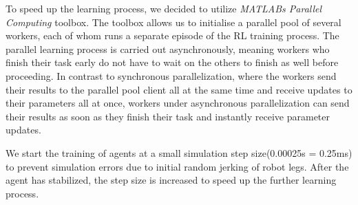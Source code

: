 To speed up the learning process, we decided to utilize \textit{MATLABs Parallel Computing} toolbox.
The toolbox allows us to initialise a parallel pool of several workers, each of whom runs a separate episode of the RL training process.
The parallel learning process is carried out asynchronously, meaning workers who finish their task early do not have to wait on the others to finish as well before proceeding.
In contrast to synchronous parallelization, where the workers send their results to the parallel pool client all at the same time and receive updates to their parameters all at once, workers under asynchronous parallelization can send their results as soon as they finish their task and instantly receive parameter updates.



We start the training of agents at a small simulation step size(0.00025s = 0.25ms) to prevent simulation errors due to initial random jerking of robot legs.
After the agent has stabilized, the step size is increased to speed up the further learning process.
\cite{lillicrap2015continuous}



\begin{comment}
	
\textbf{Optionals:}

\begin{itemize}
	\item Signal the agent that a leg is dragging by adding a discrete observation per leg which is pulled high when the leg reached its PEP.
	
	\item Add more inputs to the RL agent $\rightarrow$ Done, added accelerations
	
	\item Agent Parallelization for faster learning $\rightarrow$ Done and working
	
	\item RL Designer: Automatically save agents which reach a high enough reward to evaluate them later $\rightarrow$ Done.
	
	\item As we have multiple robotic 'actuators' in this project, a continuous action space is favorable $\rightarrow$ Not the case, as we have discrete actions
	
\end{itemize}

\end{comment}


